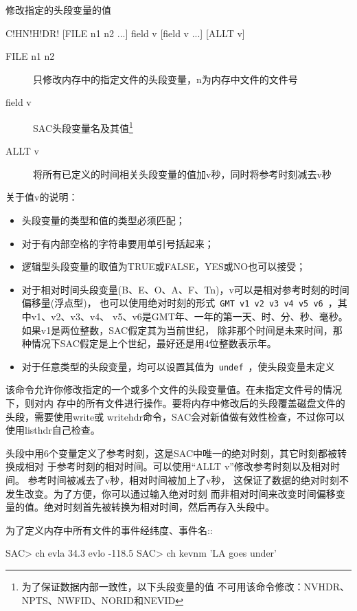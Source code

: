 \label{cmd:chnhdr}

修改指定的头段变量的值

\begin{SACSTX}
C!HN!H!DR! [FILE n1 n2 ...] field v [field v ...] [ALLT v]
\end{SACSTX}

\begin{description}
\item [FILE n1 n2] 只修改内存中的指定文件的头段变量，n为内存中文件的文件号
\item [field v] SAC头段变量名及其值\footnote{为了保证数据内部一致性，以下头段变量的值
    不可用该命令修改：NVHDR、NPTS、NWFID、NORID和NEVID}
\item [ALLT v] 将所有已定义的时间相关头段变量的值加v秒，同时将参考时刻减去v秒
\end{description}

关于值v的说明：
\begin{itemize}
\item 头段变量的类型和值的类型必须匹配；
\item 对于有内部空格的字符串要用单引号括起来；
\item 逻辑型头段变量的取值为TRUE或FALSE，YES或NO也可以接受；
\item 对于相对时间头段变量(B、E、O、A、F、Tn)，v可以是相对参考时刻的时间偏移量(浮点型)，
    也可以使用绝对时刻的形式~\verb+GMT v1 v2 v3 v4 v5 v6+~，其中v1、v2、v3、v4、
    v5、v6是GMT年、一年的第一天、时、分、秒、毫秒。如果v1是两位整数，SAC假定其为当前世纪，
    除非那个时间是未来时间，那种情况下SAC假定是上个世纪，最好还是用4位整数表示年。
\item 对于任意类型的头段变量，均可以设置其值为~\verb+undef+~，使头段变量未定义
\end{itemize}

该命令允许你修改指定的一个或多个文件的头段变量值。在未指定文件号的情况下，则对内
存中的所有文件进行操作。要将内存中修改后的头段覆盖磁盘文件的头段，需要使用write或
writehdr命令，SAC会对新值做有效性检查，不过你可以使用listhdr自己检查。

头段中用6个变量定义了参考时刻，这是SAC中唯一的绝对时刻，其它时刻都被转换成相对
于参考时刻的相对时间。可以使用``ALLT v''修改参考时刻以及相对时间。
参考时间被减去了v秒，相对时间被加上了v秒，
这保证了数据的绝对时刻不发生改变。为了方便，你可以通过输入绝对时刻
而非相对时间来改变时间偏移变量的值。绝对时刻首先被转换为相对时间，然后再存入头段中。

为了定义内存中所有文件的事件经纬度、事件名::
\begin{SACCode}
SAC> ch evla 34.3 evlo -118.5
SAC> ch kevnm 'LA goes under'
\end{SACCode}

